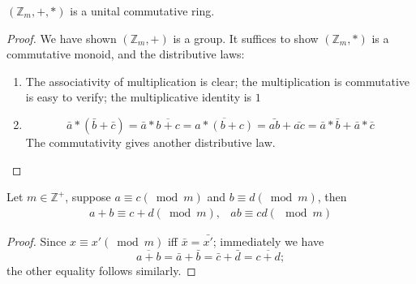 \begin{proposition}
$(\mathbb{Z}_m,+,*)$ is a unital commutative ring.
\end{proposition}
\begin{proof}
We have shown $(\mathbb{Z}_m,+)$ is a group. It suffices to show $(\mathbb{Z}_m,*)$ is a commutative monoid, and the distributive laws:
\begin{enumerate}
\item
The associativity of multiplication is clear; the multiplication is commutative is easy to verify; the multiplicative identity is $1$
\item
\[
\bar a*(\bar b+\bar c)=\bar a*\overline{b+c}=\overline{a*(b+c)}=\bar{ab}+\bar{ac}=\bar{a}*\bar{b}+\bar{a}*\bar{c}
\]
The commutativity gives another distributive law.

\end{enumerate}


\end{proof}
\begin{proposition}
Let $m\in\mathbb{Z}^+$, suppose $a\equiv c(\bmod m)$ and $b\equiv d(\bmod m)$, then
\[
\begin{array}{ll}
a+b\equiv c+d(\bmod m),
&
ab\equiv cd(\mod m)
\end{array}
\]
\end{proposition}
\begin{proof}
Since $x\equiv x'(\bmod m)$ iff $\bar{x}=\bar{x'}$; immediately we have
\[
\overline{a+b}=\bar a+\bar b=\bar c+\bar d=\overline{c+d};
\]
the other equality follows similarly.
\end{proof}

